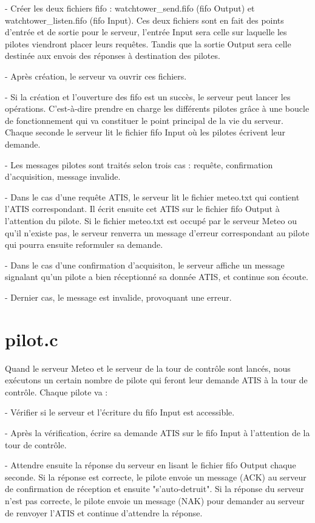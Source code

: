 \documentclass{report}
\begin{document}
{		- Créer les deux fichiers fifo : watchtower_send.fifo (fifo Output) et watchtower_listen.fifo (fifo Input).
		Ces deux fichiers sont en fait des points d'entrée et de sortie pour le serveur, l'entrée Input sera celle sur laquelle les pilotes viendront placer leurs requêtes.
		Tandis que la sortie Output sera celle destinée aux envois des réponses à destination des pilotes.

		- Après création, le serveur va ouvrir ces fichiers.

		- Si la création et l'ouverture des fifo est un succès, le serveur peut lancer les opérations. C'est-à-dire prendre en charge les différents pilotes grâce à une boucle de fonctionnement qui va constituer le point principal de la vie du serveur.
		Chaque seconde le serveur lit le fichier fifo Input où les pilotes écrivent leur demande.

		- Les messages pilotes sont traités selon trois cas : requête, confirmation d'acquisition, message invalide.

		- Dans le cas d'une requête ATIS, le serveur lit le fichier meteo.txt qui contient l'ATIS correspondant. Il écrit ensuite cet ATIS sur le fichier fifo Output à l'attention du pilote. 
		Si le fichier meteo.txt est occupé par le serveur Meteo ou qu'il n'existe pas, le serveur renverra un message d'erreur correspondant au pilote qui pourra ensuite reformuler sa demande.

		- Dans le cas d'une confirmation d'acquisiton, le serveur affiche un message signalant qu'un pilote a bien réceptionné sa donnée ATIS, et continue son écoute.

		- Dernier cas, le message est invalide, provoquant une erreur.
 

	\section{pilot.c}
		
		Quand le serveur Meteo et le serveur de la tour de contrôle sont lancés, nous exécutons un certain nombre de pilote qui feront leur demande ATIS à la tour de contrôle.
		Chaque pilote va : 
		
		- Vérifier si le serveur et l'écriture du fifo Input est accessible.
		
		- Après la vérification, écrire sa demande ATIS sur le fifo Input à l'attention de la tour de contrôle.
		
		- Attendre ensuite la réponse du serveur en lisant le fichier fifo Output chaque seconde. Si la réponse est correcte, le pilote envoie un message (ACK) au serveur de confirmation de réception et ensuite "s'auto-detruit".  Si la réponse du serveur n'est pas correcte, le pilote envoie un message (NAK) pour demander au serveur de renvoyer l'ATIS et continue d'attendre la réponse.
		
}
\end{document}
